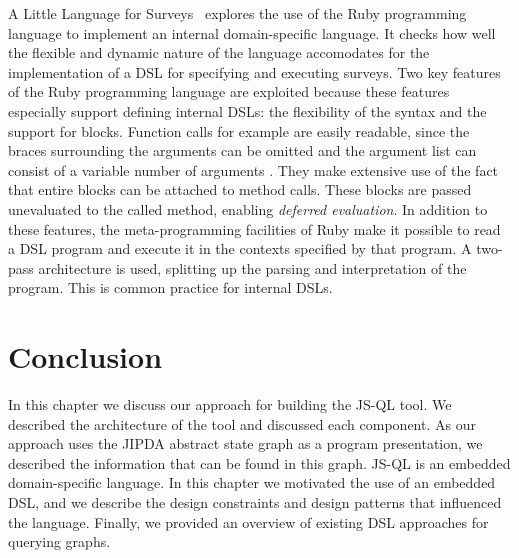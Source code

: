 A Little Language for Surveys~\cite{RubyDSL} explores the use of the Ruby programming language to implement an internal domain-specific language. It checks how well the flexible and dynamic nature of the language accomodates for the implementation of a DSL for specifying and executing surveys. Two key features of the Ruby programming language are exploited because these features especially support defining internal DSLs: the flexibility of the syntax and the support for blocks. Function calls for example are easily readable, since the braces surrounding the arguments can be omitted and the argument list can consist of a variable number of arguments . They make extensive use of the fact that entire blocks can be attached to method calls. These blocks are passed unevaluated to the called method, enabling \textit{deferred evaluation}. In addition to these features, the meta-programming facilities of Ruby make it possible to read a DSL program and execute it in the contexts specified by that program. A two-pass architecture is used, splitting up the parsing and interpretation of the program. This is common practice for internal DSLs.


\section{Conclusion}
In this chapter we discuss our approach for building the JS-QL tool. We described the architecture of the tool and discussed each component. As our approach uses the JIPDA abstract state graph as a program presentation, we described the information that can be found in this graph. JS-QL is an embedded domain-specific language. In this chapter we motivated the use of an embedded DSL, and we describe the design constraints and design patterns that influenced the language. Finally, we provided an overview of existing DSL approaches for querying graphs.

